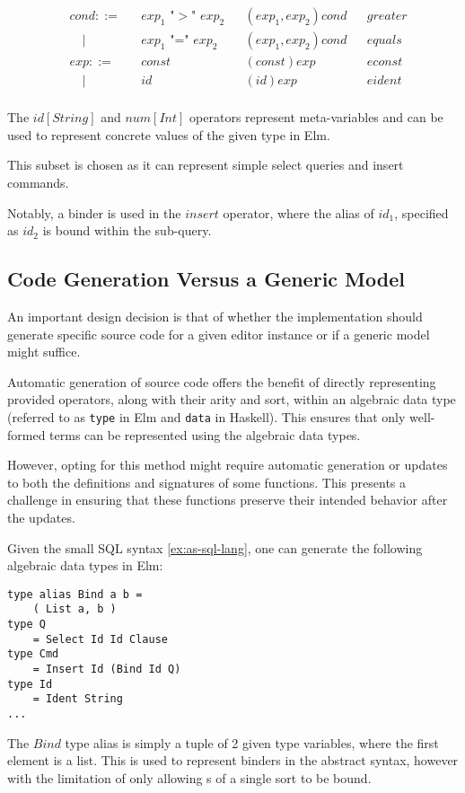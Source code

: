 \documentclass[sigplan,screen]{acmart}
\begin{document}
\begin{example}
\[\begin{aligned}
       & cond ::=    &  & \text{$exp_1$ "$>$" $exp_2$}    &   & (exp_1,exp_2)cond       &  & greater         \\
       & \quad |     &  & \text{$exp_1$ "=" $exp_2$}      &   & (exp_1,exp_2)cond       &  & equals          \\
       & exp ::=     &  & \text{$const$}                  &   & (const)exp              &  & econst          \\
       & \quad |     &  & \text{$id$}                     &   & (id)exp                 &  & eident          \\
    \end{aligned}
  \]


  The $id[String]$ and $num[Int]$ operators represent meta-variables and can be used to represent concrete values of the given type in Elm.

  This subset is chosen as it can represent simple select queries and insert commands.

  Notably, a binder is used in the $insert$ operator, where the alias of $id_1$, specified as $id_2$ is bound within the sub-query.
\end{example}

\subsection{Code Generation Versus a Generic Model}

An important design decision is that of whether the implementation
should generate specific source code for a given editor instance or if a
generic model might suffice.

Automatic generation of source code offers the benefit of directly
representing provided operators, along with their arity and sort,
within an algebraic data type (referred to as \texttt{type} in Elm and
\texttt{data} in Haskell).  This ensures that only well-formed terms
can be represented using the algebraic data types.

However, opting for this method might require automatic generation or
updates to both the definitions and signatures of some functions.
This presents a challenge in ensuring that these functions preserve
their intended behavior after the updates.

\begin{example}\label{ex:sql-data-types}
  Given the small SQL syntax \cref{ex:as-sql-lang}, one can generate the following algebraic data types in Elm:
  \begin{lstlisting}[style=examplestyle]
type alias Bind a b =
    ( List a, b )
type Q
    = Select Id Id Clause
type Cmd
    = Insert Id (Bind Id Q)
type Id
    = Ident String
...
\end{lstlisting}

  The $Bind$ type alias is simply a tuple of 2 given type variables,
  where the first element is a list. This is used to represent binders in the
  abstract syntax, however with the limitation of only allowing {\abt}s of a single
  sort to be bound.
\end{example}
\end{document}
